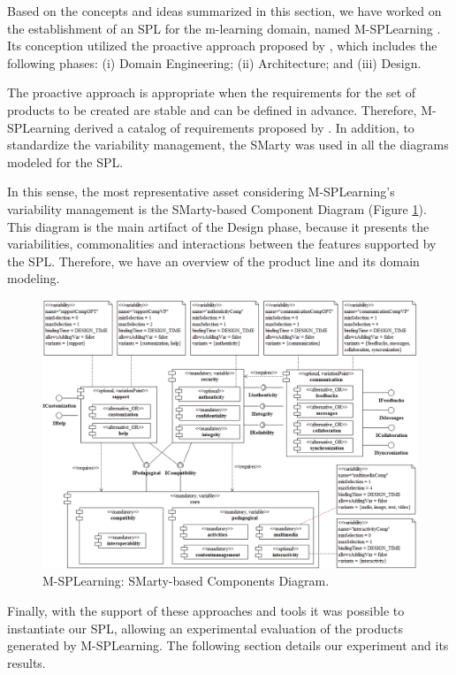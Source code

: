 Based on the concepts and ideas summarized in this section, we have worked on the establishment of an SPL for the m-learning domain, named M-SPLear\allowbreak ning \cite{falvojr14,falvojr14b}. Its conception utilized the proactive approach proposed by \cite{krueger02}, which includes the following phases: (i) Domain Engineering; (ii) Architecture; and (iii) Design.

The proactive approach is appropriate when the requirements for the set of products to be created are stable and can be defined in advance. Therefore, M-SPLear\allowbreak ning derived a catalog of requirements proposed by \cite{filho13}. In addition, to standardize the variability management, the SMarty was used in all the diagrams modeled for the SPL.

In this sense, the most representative asset considering M-SPLear\allowbreak ning's variability management is the SMarty-based Component Diagram (Figure \ref{fig:msplearning-design}). This diagram is the main artifact of the Design phase, because it presents the variabilities, commonalities and interactions between the features supported by the SPL. Therefore, we have an overview of the product line and its domain modeling.

\begin{figure}[!ht]
\centering
\includegraphics[width=1.05\textwidth]{MSPLDesign.png}
\centering
\caption{M-SPLearning: SMarty-based Components Diagram.}
\label{fig:msplearning-design}
\end{figure}

Finally, with the support of these approaches and tools it was possible to instantiate our SPL, allowing an experimental evaluation of the products generated by M-SPLearning. The following section details our experiment and its results.
